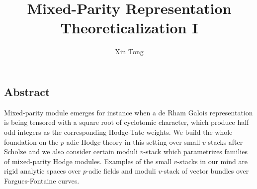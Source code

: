 \documentclass[12pt]{book}
\title{Mixed-Parity Representation Theoreticalization I}
\author{Xin Tong}
\date{}
\theoremstyle{definition}
\begin{document}
\maketitle



\newpage
\subsection*{Abstract}
Mixed-parity module emerges for instance when a de Rham Galois representation is being tensored with a square root of cyclotomic character, which produce half odd integers as the corresponding Hodge-Tate weights. We build the whole foundation on the $p$-adic Hodge theory in this setting over small $v$-stacks after Scholze and we also consider certain moduli $v$-stack which parametrizes families of mixed-parity Hodge modules. Examples of the small $v$-stacks in our mind are rigid analytic spaces over $p$-adic fields and moduli $v$-stack of vector bundles over Fargues-Fontaine curves. 



\newpage
\tableofcontents

\newpage
\end{document}
